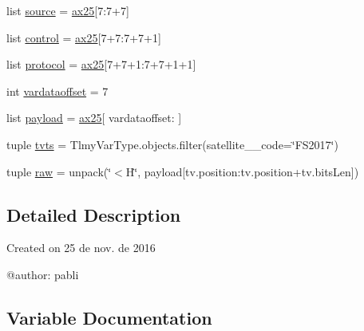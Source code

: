 \begin{DoxyCompactItemize}
list \hyperlink{namespace_simulators_1_1_tlmy_decode_test_af4015191c22823cc047e34f7b3495a20}{source} = \hyperlink{namespace_simulators_1_1_tlmy_decode_test_ab722e6f19835692ab6fc8586a9c2bf56}{ax25}\mbox{[}7\+:7+7\mbox{]}
\item 
list \hyperlink{namespace_simulators_1_1_tlmy_decode_test_acc0c5ea1fa6814b724d1eab5f3a39581}{control} = \hyperlink{namespace_simulators_1_1_tlmy_decode_test_ab722e6f19835692ab6fc8586a9c2bf56}{ax25}\mbox{[}7+7\+:7+7+1\mbox{]}
\item 
list \hyperlink{namespace_simulators_1_1_tlmy_decode_test_aac705aff6da570227b368a174ac4b94e}{protocol} = \hyperlink{namespace_simulators_1_1_tlmy_decode_test_ab722e6f19835692ab6fc8586a9c2bf56}{ax25}\mbox{[}7+7+1\+:7+7+1+1\mbox{]}
\item 
int \hyperlink{namespace_simulators_1_1_tlmy_decode_test_a050c65974d434e666339733f4804a983}{vardataoffset} = 7
\item 
list \hyperlink{namespace_simulators_1_1_tlmy_decode_test_abe7d12cdc50e34bef3a5fb88f5e58128}{payload} = \hyperlink{namespace_simulators_1_1_tlmy_decode_test_ab722e6f19835692ab6fc8586a9c2bf56}{ax25}\mbox{[} vardataoffset\+: \mbox{]}
\item 
tuple \hyperlink{namespace_simulators_1_1_tlmy_decode_test_ae0b90d4bc7d21c2b3339c16cafb44c61}{tvts} = Tlmy\+Var\+Type.\+objects.\+filter(satellite\+\_\+\+\_\+code=\char`\"{}F\+S2017\char`\"{})
\item 
tuple \hyperlink{namespace_simulators_1_1_tlmy_decode_test_a760536b1eb2885f9620232c9aefbac41}{raw} = unpack(\char`\"{}$<$H\char`\"{}, payload\mbox{[}tv.\+position\+:tv.\+position+tv.\+bits\+Len\mbox{]})
\end{DoxyCompactItemize}


\subsection{Detailed Description}
\begin{DoxyVerb}Created on 25 de nov. de 2016

@author: pabli
\end{DoxyVerb}
 

\subsection{Variable Documentation}
\hypertarget{namespace_simulators_1_1_tlmy_decode_test_a51f14e6b84a52552161b97798ed7a930}{}
